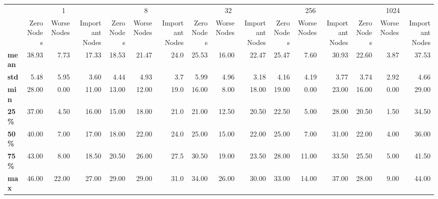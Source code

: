 \begin{tabular}{lrrrrrrrrrrrrrrr}
\toprule
{} & \multicolumn{3}{c}{1} & \multicolumn{3}{c}{8} & \multicolumn{3}{c}{32} & \multicolumn{3}{c}{256} & \multicolumn{3}{c}{1024} \\
{} & Zero Nodes & Worse Nodes & Important Nodes & Zero Nodes & Worse Nodes & Important Nodes & Zero Nodes & Worse Nodes & Important Nodes & Zero Nodes & Worse Nodes & Important Nodes & Zero Nodes & Worse Nodes & Important Nodes \\
\midrule
\textbf{mean} &      38.93 &        7.73 &           17.33 &      18.53 &       21.47 &            24.0 &      25.53 &       16.00 &           22.47 &      25.47 &        7.60 &           30.93 &      22.60 &        3.87 &           37.53 \\
\textbf{std } &       5.48 &        5.95 &            3.60 &       4.44 &        4.93 &             3.7 &       5.99 &        4.96 &            3.18 &       4.16 &        4.19 &            3.77 &       3.74 &        2.92 &            4.66 \\
\textbf{min } &      28.00 &        0.00 &           11.00 &      13.00 &       12.00 &            19.0 &      16.00 &        8.00 &           18.00 &      19.00 &        0.00 &           23.00 &      16.00 &        0.00 &           29.00 \\
\textbf{25\% } &      37.00 &        4.50 &           16.00 &      15.00 &       18.00 &            21.0 &      21.00 &       12.50 &           20.50 &      22.50 &        5.00 &           28.00 &      20.50 &        1.50 &           34.50 \\
\textbf{50\% } &      40.00 &        7.00 &           17.00 &      18.00 &       22.00 &            24.0 &      25.00 &       15.00 &           22.00 &      25.00 &        7.00 &           31.00 &      22.00 &        4.00 &           36.00 \\
\textbf{75\% } &      43.00 &        8.00 &           18.50 &      20.50 &       26.00 &            27.5 &      30.50 &       19.00 &           23.50 &      28.00 &       11.00 &           33.50 &      25.50 &        5.00 &           41.50 \\
\textbf{max } &      46.00 &       22.00 &           27.00 &      29.00 &       29.00 &            31.0 &      34.00 &       26.00 &           30.00 &      33.00 &       14.00 &           37.00 &      28.00 &        9.00 &           44.00 \\
\bottomrule
\end{tabular}
